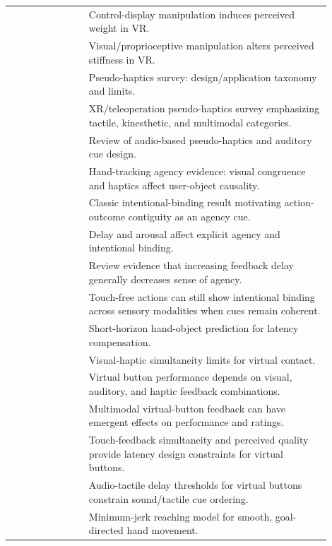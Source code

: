 \documentclass[11pt]{article}
\begin{document}
\begin{longtable}{p{0.22\linewidth}p{0.68\linewidth}}
\cite{samad2019pseudoweight} & Control-display manipulation induces perceived weight in VR. \\
\cite{weiss2023pseudostiffness} & Visual/proprioceptive manipulation alters perceived stiffness in VR. \\
\cite{ujitoko2021survey} & Pseudo-haptics survey: design/application taxonomy and limits. \\
\cite{xavier2024survey} & XR/teleoperation pseudo-haptics survey emphasizing tactile, kinesthetic, and multimodal categories. \\
\cite{abdo2024audio} & Review of audio-based pseudo-haptics and auditory cue design. \\
\cite{evangelou2023agency} & Hand-tracking agency evidence: visual congruence and haptics affect user-object causality. \\
\cite{haggard2002voluntary} & Classic intentional-binding result motivating action-outcome contiguity as an agency cue. \\
\cite{wen2015delayagency} & Delay and arousal affect explicit agency and intentional binding. \\
\cite{wen2019delayreview} & Review evidence that increasing feedback delay generally decreases sense of agency. \\
\cite{liu2024intentionalbinding} & Touch-free actions can still show intentional binding across sensory modalities when cues remain coherent. \\
\cite{salvato2022prediction} & Short-horizon hand-object prediction for latency compensation. \\
\cite{diluca2019simultaneity} & Visual-haptic simultaneity limits for virtual contact. \\
\cite{faeth2012modality} & Virtual button performance depends on visual, auditory, and haptic feedback combinations. \\
\cite{faeth2014emergent} & Multimodal virtual-button feedback can have emergent effects on performance and ratings. \\
\cite{kaaresoja2014temporallyperfect} & Touch-feedback simultaneity and perceived quality provide latency design constraints for virtual buttons. \\
\cite{brahimaj2023audiotactilebutton} & Audio-tactile delay thresholds for virtual buttons constrain sound/tactile cue ordering. \\
\cite{flash1985minimumjerk} & Minimum-jerk reaching model for smooth, goal-directed hand movement. \\

\end{longtable}
\end{document}
